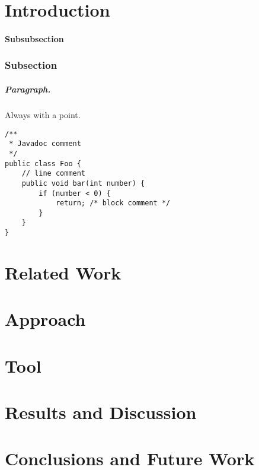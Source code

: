 \documentclass{seal_thesis}
\begin{document}
\begin{abstract}
\end{abstract}

\begin{zusammenfassung}
\end{zusammenfassung}

\tableofcontents
\listoffigures
\listoftables
\lstlistoflistings

\mainmatter
\chapter{Introduction}
\label{sec:intro}


%
\subsubsection{Subsubsection}

\subsection{Subsection}
%
\paragraph{Paragraph.} Always with a point.

\begin{lstlisting}[caption=An example code snippet]
/**
 * Javadoc comment
 */
public class Foo {
	// line comment
	public void bar(int number) {
		if (number < 0) {
			return; /* block comment */
		}
	}
}
\end{lstlisting}



\chapter{Related Work}
\label{sec:related_1}


\chapter{Approach}

\chapter{Tool}

\chapter{Results and Discussion}

\chapter{Conclusions and Future Work}




\backmatter


\end{document}
